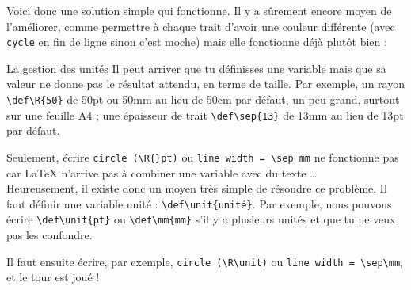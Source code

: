Voici donc une solution simple qui fonctionne. Il y a sûrement encore moyen de l'améliorer, comme permettre à chaque trait d'avoir une couleur différente (avec \verb?cycle? en fin de ligne sinon c'est moche) mais elle fonctionne déjà plutôt bien :


\begin{conseilbox}{La gestion des unités}
Il peut arriver que tu définisses une variable mais que sa valeur ne donne pas le résultat attendu, en terme de taille. Par exemple, un rayon \verb?\def\R{50}? de 50pt ou 50mm au lieu de 50cm par défaut, un peu grand, surtout sur une feuille A4 ; une épaisseur de trait \verb?\def\sep{13}? de 13mm au lieu de 13pt par défaut.

Seulement, écrire \verb?circle (\R{}pt)? ou \verb?line width = \sep mm? ne fonctionne pas car \LaTeX{} n'arrive pas à combiner une variable avec du texte \dots{} \\

Heureusement, il existe donc un moyen très simple de résoudre ce problème. Il faut définir une variable unité : \verb?\def\unit{unité}?. Par exemple, nous pouvons écrire \verb?\def\unit{pt}? ou \verb?\def\mm{mm}? s'il y a plusieurs unités et que tu ne veux pas les confondre.

Il faut ensuite écrire, par exemple, \verb?circle (\R\unit)? ou \verb?line width = \sep\mm?, et le tour est joué !
\end{conseilbox}


